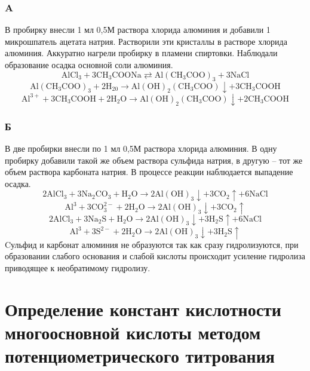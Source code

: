 \documentclass[a4paper,12pt]{article}
\begin{document}
\subsubsection{A} В пробирку внесли 1 мл 0,5М раствора хлорида алюминия и добавили
1 микрошпатель ацетата натрия. Растворили эти кристаллы в растворе хлорида
алюминия. Аккуратно нагрели пробирку в пламени спиртовки. Наблюдали
образование осадка основной соли алюминия.
\begin{equation}
\mathrm{AlCl_3 + 3CH_3COONa \rightleftarrows Al(CH_3COO)_3+3NaCl }
\end{equation} 
\begin{equation}
\mathrm{Al(CH_3COO)_3 + 2H_20 \rightarrow Al(OH)_2(CH_3COO)\downarrow+3CH_3COOH }
\end{equation}
\begin{equation}
\mathrm{Al^{3+} + 3CH_3COOH+ 2H_2O \rightarrow Al(OH)_2(CH_3COO)\downarrow+2CH_3COOH }
\end{equation}
 
\subsubsection{Б}В две пробирки внесли по 1 мл 0,5М раствора хлорида алюминия. В одну
пробирку добавили такой же объем раствора сульфида натрия, в другую – тот же объем
раствора карбоната натрия. В процессе реакции наблюдается выпадение осадка. 
\begin{equation}
\mathrm{2AlCl_3 + 3Na_2CO_3 + H_2O \rightarrow 2Al(OH)_3\downarrow+3CO_2\uparrow + 6NaCl }
\end{equation} 
\begin{equation}
\mathrm{Al^{3} + 3CO_3^{2-}+ 2H_2O \rightarrow 2Al(OH)_3\downarrow+3CO_2\uparrow }
\end{equation} 
\begin{equation}
\mathrm{2AlCl_3 + 3Na_2S + H_2O \rightarrow 2Al(OH)_3\downarrow+3H_2S\uparrow + 6NaCl }
\end{equation} 
\begin{equation}
\mathrm{Al^{3} + 3S^{2-}+ 2H_2O \rightarrow 2Al(OH)_3\downarrow+3H_2S\uparrow }
\end{equation} 
Cульфид и карбонат алюминия не образуются так как сразу гидролизуются, при образовании слабого основания и слабой кислоты происходит усиление гидролиза приводящее к необратимому гидролизу.

\section{Определение констант кислотности многоосновной кислоты
методом потенциометрического титрования}
\end{document}

